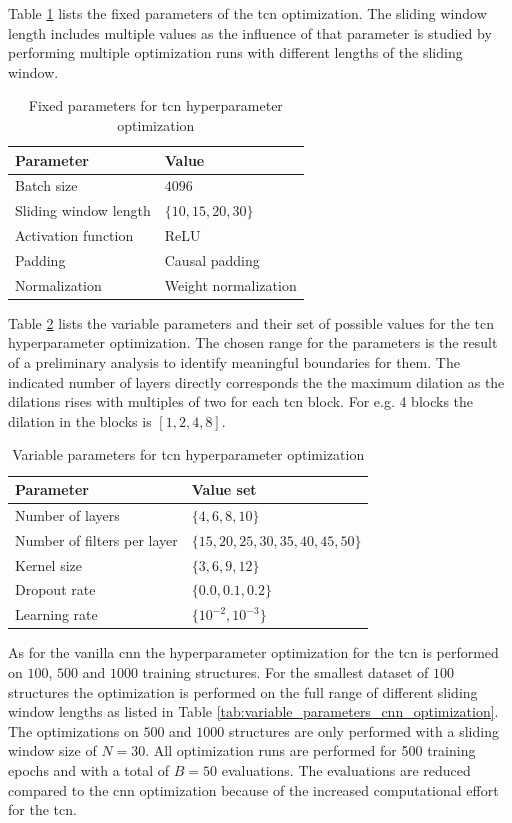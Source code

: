 \documentclass[conference]{IEEEtran}
\begin{document}
Table \ref{tab:fixed_parameters_tcn_optimization} lists the fixed parameters of the \gls{tcn} optimization. The sliding window length includes multiple values as the influence of that parameter is studied by performing multiple optimization runs with different lengths of the sliding window.

\begin{table}[htp]
	\centering
	\caption{Fixed parameters for \gls{tcn} hyperparameter optimization}
	\label{tab:fixed_parameters_tcn_optimization}
	\begin{tabular}{ll}
		\textbf{Parameter} & \textbf{Value} \\
		\hline
		Batch size & $ 4096 $ \\
		Sliding window length & $ \{10, 15, 20, 30\} $ \\
		Activation function & ReLU \\
		Padding & Causal padding \\
		Normalization & Weight normalization
	\end{tabular}
\end{table}

Table \ref{tab:variable_parameters_tcn_optimization} lists the variable parameters and their set of possible values for the \gls{tcn} hyperparameter optimization. The chosen range for the parameters is the result of a preliminary analysis to identify meaningful boundaries for them. The indicated number of layers directly corresponds the the maximum dilation as the dilations rises with multiples of two for each \gls{tcn} block. For e.g. 4 blocks the dilation in the blocks is $ [1, 2, 4, 8] $.


\begin{table}[htp]
	\centering
	\caption{Variable parameters for \gls{tcn} hyperparameter optimization}
	\label{tab:variable_parameters_tcn_optimization}
	\begin{tabular}{ll}
		\textbf{Parameter} & \textbf{Value set} \\
		\hline
		Number of layers & $ \{4, 6, 8, 10\} $ \\
		Number of filters per layer & $ \{15, 20, 25, 30, 35, 40, 45, 50\} $ \\
		Kernel size & $ \{3, 6, 9, 12\} $ \\
		Dropout rate & $ \{0.0, 0.1, 0.2\} $ \\
		Learning rate & $ \{10^{-2}, 10^{-3}\} $
	\end{tabular}
\end{table}

As for the vanilla \gls{cnn} the hyperparameter optimization for the \gls{tcn} is performed on $ 100 $, $ 500 $ and $ 1000 $  training structures. For the smallest dataset of $ 100 $ structures the optimization is performed on the full range of different sliding window lengths as listed in Table \ref{tab:variable_parameters_cnn_optimization}. The optimizations on $ 500 $ and $ 1000 $ structures are only performed with a sliding window size of $ N = 30 $. All optimization runs are performed for 500 training epochs and with a total of $ B = 50 $ evaluations. The evaluations are reduced compared to the \gls{cnn} optimization because of the increased computational effort for the \gls{tcn}.
\end{document}
